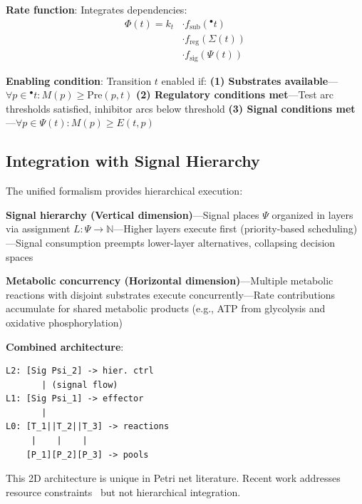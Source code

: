 \vspace{3pt}
\noindent\textbf{Rate function}: Integrates dependencies:
\begin{align*}
\Phi(t) = k_t &\cdot f_{\text{sub}}({}^\bullet t) \\
&\cdot f_{\text{reg}}(\Sigma(t)) \\
&\cdot f_{\text{sig}}(\Psi(t))
\end{align*}

\vspace{3pt}
\noindent\textbf{Enabling condition}: Transition $t$ enabled if: \textbf{(1) Substrates available}---$\forall p \in {}^\bullet t: M(p) \geq \text{Pre}(p, t)$ \textbf{(2) Regulatory conditions met}---Test arc thresholds satisfied, inhibitor arcs below threshold \textbf{(3) Signal conditions met}---$\forall p \in \Psi(t): M(p) \geq E(t, p)$

\subsection{Integration with Signal Hierarchy}

\vspace{3pt}
\noindent The unified formalism provides hierarchical execution:

\vspace{3pt}
\noindent\textbf{Signal hierarchy (Vertical dimension)}---Signal places $\Psi$ organized in layers via assignment $L: \Psi \to \mathbb{N}$---Higher layers execute first (priority-based scheduling)---Signal consumption preempts lower-layer alternatives, collapsing decision spaces

\vspace{3pt}
\noindent\textbf{Metabolic concurrency (Horizontal dimension)}---Multiple metabolic reactions with disjoint substrates execute concurrently---Rate contributions accumulate for shared metabolic products (e.g., ATP from glycolysis and oxidative phosphorylation)

\vspace{3pt}
\noindent\textbf{Combined architecture}:
\begin{center}
\begin{verbatim}
L2: [Sig Psi_2] -> hier. ctrl
       | (signal flow)
L1: [Sig Psi_1] -> effector
       |
L0: [T_1||T_2||T_3] -> reactions
     |    |    |
    [P_1][P_2][P_3] -> pools
\end{verbatim}
\end{center}

\vspace{3pt}
\noindent This 2D architecture is unique in Petri net literature. Recent work addresses resource constraints~\cite{genovese2021} but not hierarchical integration.
